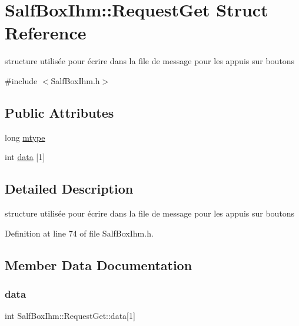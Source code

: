 \hypertarget{struct_salf_box_ihm_1_1_request_get}{}\section{Salf\+Box\+Ihm\+:\+:Request\+Get Struct Reference}
\label{struct_salf_box_ihm_1_1_request_get}


structure utilisée pour écrire dans la file de message pour les appuis sur boutons  




{\ttfamily \#include $<$Salf\+Box\+Ihm.\+h$>$}

\subsection*{Public Attributes}
\begin{DoxyCompactItemize}
\item 
long \hyperlink{struct_salf_box_ihm_1_1_request_get_a4d551291208c5aee03b0e6fb080a0fc5}{mtype}
\item 
int \hyperlink{struct_salf_box_ihm_1_1_request_get_a873745e0eb8130fcaea0d836377b623a}{data} \mbox{[}1\mbox{]}
\end{DoxyCompactItemize}


\subsection{Detailed Description}
structure utilisée pour écrire dans la file de message pour les appuis sur boutons 

Definition at line 74 of file Salf\+Box\+Ihm.\+h.



\subsection{Member Data Documentation}
\mbox{\label{struct_salf_box_ihm_1_1_request_get_a873745e0eb8130fcaea0d836377b623a}} 
\subsubsection{\texorpdfstring{data}{data}}
{\footnotesize\ttfamily int Salf\+Box\+Ihm\+::\+Request\+Get\+::data\mbox{[}1\mbox{]}}



